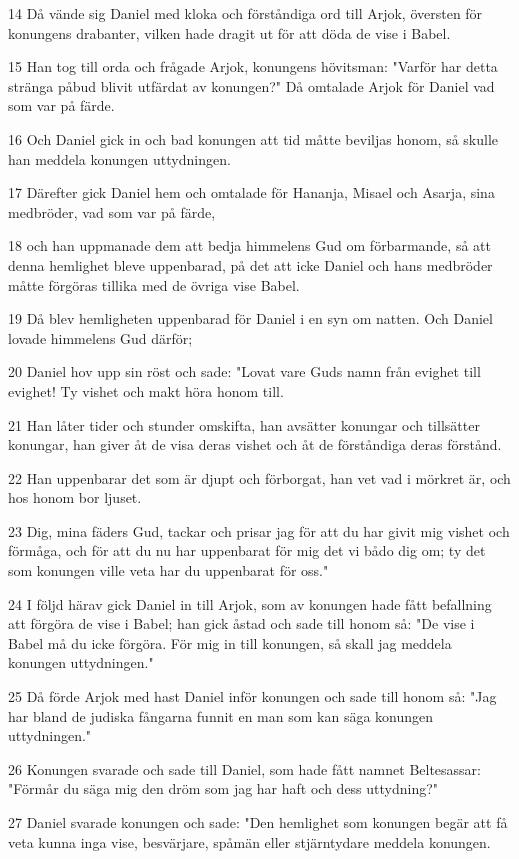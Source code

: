 \par 14 Då vände sig Daniel med kloka och förståndiga ord till Arjok, översten för konungens drabanter, vilken hade dragit ut för att döda de vise i Babel.
\par 15 Han tog till orda och frågade Arjok, konungens hövitsman: "Varför har detta stränga påbud blivit utfärdat av konungen?" Då omtalade Arjok för Daniel vad som var på färde.
\par 16 Och Daniel gick in och bad konungen att tid måtte beviljas honom, så skulle han meddela konungen uttydningen.
\par 17 Därefter gick Daniel hem och omtalade för Hananja, Misael och Asarja, sina medbröder, vad som var på färde,
\par 18 och han uppmanade dem att bedja himmelens Gud om förbarmande, så att denna hemlighet bleve uppenbarad, på det att icke Daniel och hans medbröder måtte förgöras tillika med de övriga vise Babel.
\par 19 Då blev hemligheten uppenbarad för Daniel i en syn om natten. Och Daniel lovade himmelens Gud därför;
\par 20 Daniel hov upp sin röst och sade: "Lovat vare Guds namn från evighet till evighet! Ty vishet och makt höra honom till.
\par 21 Han låter tider och stunder omskifta, han avsätter konungar och tillsätter konungar, han giver åt de visa deras vishet och åt de förståndiga deras förstånd.
\par 22 Han uppenbarar det som är djupt och förborgat, han vet vad i mörkret är, och hos honom bor ljuset.
\par 23 Dig, mina fäders Gud, tackar och prisar jag för att du har givit mig vishet och förmåga, och för att du nu har uppenbarat för mig det vi bådo dig om; ty det som konungen ville veta har du uppenbarat för oss."
\par 24 I följd härav gick Daniel in till Arjok, som av konungen hade fått befallning att förgöra de vise i Babel; han gick åstad och sade till honom så: "De vise i Babel må du icke förgöra. För mig in till konungen, så skall jag meddela konungen uttydningen."
\par 25 Då förde Arjok med hast Daniel inför konungen och sade till honom så: "Jag har bland de judiska fångarna funnit en man som kan säga konungen uttydningen."
\par 26 Konungen svarade och sade till Daniel, som hade fått namnet Beltesassar: "Förmår du säga mig den dröm som jag har haft och dess uttydning?"
\par 27 Daniel svarade konungen och sade: "Den hemlighet som konungen begär att få veta kunna inga vise, besvärjare, spåmän eller stjärntydare meddela konungen.
